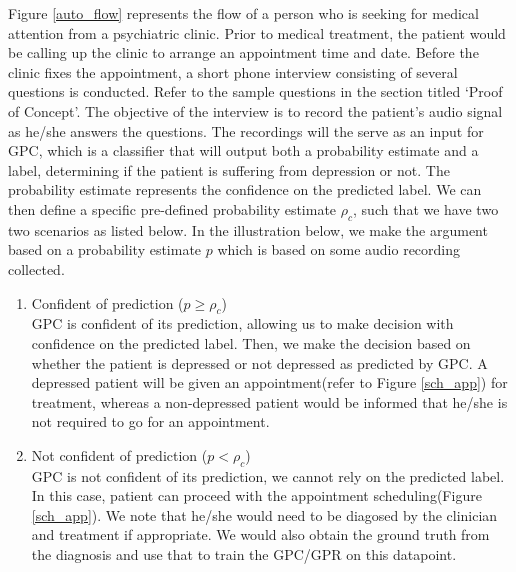 \documentclass{article}
\begin{document}
	Figure \ref{auto_flow} represents the flow of a person who is seeking for medical attention from a psychiatric clinic.
	Prior to medical treatment, the patient would be calling up the clinic to arrange an appointment time and date. 
	Before the clinic fixes the appointment, a short phone interview consisting of several questions is conducted.
	Refer to the sample questions in the section titled `Proof of Concept'.
	The objective of the interview is to record the patient's audio signal as he/she answers the questions.
	The recordings will the serve as an input for GPC, which is a classifier that will output both a probability estimate and a label, determining if the patient is suffering from depression or not.
	The probability estimate represents the confidence on the predicted label. 
	We can then define a specific pre-defined probability estimate $\rho_c$, such that we have two two scenarios as listed below. 
	In the illustration below, we make the argument based on a probability estimate $p$ which is based on some audio recording collected.
	
	\begin{enumerate}
		\item {Confident of prediction ($p \geq \rho_c$)} \\
		GPC is confident of its prediction, allowing us to make decision with confidence on the predicted label.
		Then, we make the decision based on whether the patient is depressed or not depressed as predicted by GPC. 
		A depressed patient will be given an appointment(refer to Figure \ref{sch_app}) for treatment, whereas a non-depressed patient would be informed that he/she is not required to go for an appointment.
		\item {Not confident of prediction ($p < \rho_c$}) \\
		GPC is not confident of its prediction, we cannot rely on the predicted label. 
		In this case, patient can proceed with the appointment scheduling(Figure \ref{sch_app}). 
		We note that he/she would need to be diagosed by the clinician and treatment if appropriate. 
		We would also obtain the ground truth from the diagnosis and use that to train the GPC/GPR on this datapoint. 
	\end{enumerate}
	
\end{document}
